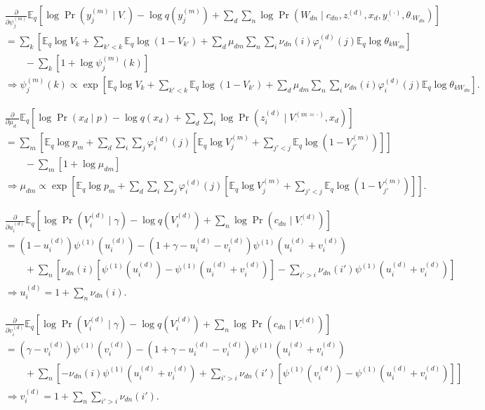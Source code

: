 \documentclass{article}
\newcommand{\trigamma}[1]{\ensuremath{\psi^{(1)}\left(#1\right)}}
\newcommand{\Eq}{\ensuremath{\mathbb{E}_q\xspace}}
\newcommand{\pd}[1]{\ensuremath{\frac{\partial}{\partial #1}}}
\begin{document}
\begin{align*}
    &\pd{\psi_j^{(m)}} \Eq \left[ \log \Pr(y_j^{(m)} \mid V_\cdot) - \log q(y_j^{(m)}) + \sum_d \sum_n \log \Pr\left(W_{dn} \mid c_{dn}, z_\cdot^{(d)}, x_d, y_\cdot^{(\cdot)}, \theta_{\cdot W_{dn}}\right) \right] \\
    &= \sum_k \left[ \Eq \log V_k + \sum_{k'<k} \Eq \log (1-V_{k'}) + \sum_d \mu_{dm} \sum_n \sum_i \nu_{dn}(i) \varphi_i^{(d)}(j) \Eq \log \theta_{k W_{dn}} \right] \\
    &\qquad - \sum_k \left[ 1 + \log \psi_j^{(m)}(k) \right] \\
    &\Rightarrow
    \boxed{ \psi_j^{(m)}(k) \propto \exp\left[ \Eq \log V_k + \sum_{k'<k} \Eq \log (1-V_{k'}) + \sum_d \mu_{dm} \sum_n \sum_i \nu_{dn}(i) \varphi_i^{(d)}(j) \Eq \log \theta_{k W_{dn}} \right] } .
\end{align*}

\begin{align*}
    &\pd{\mu_{d\cdot}} \Eq \left[ \log \Pr(x_d \mid p) - \log q(x_d) + \sum_d \sum_i \log \Pr(z_i^{(d)} \mid V^{(m=\cdot)}_\cdot, x_d) \right] \\
    &= \sum_m \left[ \Eq \log{p_m} + \sum_d \sum_i \sum_j \varphi_i^{(d)}(j) \left[ \Eq \log V^{(m)}_j + \sum_{j'<j} \Eq \log (1-V^{(m)}_{j'}) \right] \right] \\
    &\qquad - \sum_m \left[ 1 + \log \mu_{dm} \right] \\
    &\Rightarrow
    \boxed{ \mu_{dm} \propto \exp\left[ \Eq \log{p_m} + \sum_d \sum_i \sum_j \varphi_i^{(d)}(j) \left[ \Eq \log V^{(m)}_j + \sum_{j'<j} \Eq \log (1-V^{(m)}_{j'}) \right] \right] }.
\end{align*}

\begin{align*}
    &\pd{u_i^{(d)}} \Eq \left[ \log \Pr(V_i^{(d)} \mid \gamma) - \log q(V_i^{(d)}) + \sum_n \log \Pr(c_{dn} \mid V^{(d)}_\cdot) \right] \\
    &= (1 - u_i^{(d)}) \trigamma{u_i^{(d)}} - (1 + \gamma - u_i^{(d)} - v_i^{(d)}) \trigamma{u_i^{(d)} + v_i^{(d)}} \\
    &\qquad + \sum_n \left[ \nu_{dn}(i) \left[ \trigamma{u_i^{(d)}} - \trigamma{u_i^{(d)} + v_i^{(d)}} \right] - \sum_{i'>i} \nu_{dn}(i') \trigamma{u_i^{(d)} + v_i^{(d)}} \right] \\
    &\Rightarrow
    \boxed{ u_i^{(d)} = 1 + \sum_n \nu_{dn}(i) }.
\end{align*}

\begin{align*}
    &\pd{v_i^{(d)}} \Eq \left[ \log \Pr(V_i^{(d)} \mid \gamma) - \log q(V_i^{(d)}) + \sum_n \log \Pr(c_{dn} \mid V^{(d)}_\cdot) \right] \\
    &= (\gamma - v_i^{(d)}) \trigamma{v_i^{(d)}} - (1 + \gamma - u_i^{(d)} - v_i^{(d)}) \trigamma{u_i^{(d)} + v_i^{(d)}} \\
    &\qquad + \sum_n \left[ - \nu_{dn}(i) \trigamma{u_i^{(d)} + v_i^{(d)}} + \sum_{i'>i} \nu_{dn}(i') \left[ \trigamma{v_i^{(d)}} - \trigamma{u_i^{(d)} + v_i^{(d)}} \right] \right] \\
    &\Rightarrow
    \boxed{ v_i^{(d)} = 1 + \sum_n \sum_{i'>i} \nu_{dn}(i') }.
\end{align*}
\end{document}
